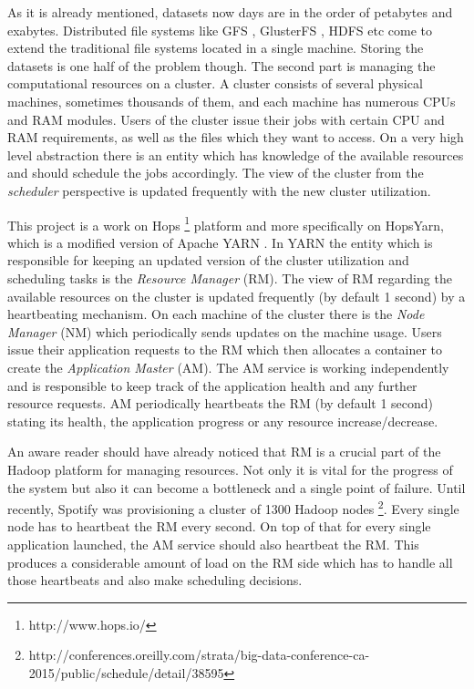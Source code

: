 As it is already mentioned, datasets now days are in the order of
petabytes and exabytes. Distributed file systems like GFS
\cite{Ghemawat:2003:GFS:1165389.945450}, 
GlusterFS \cite{glusterfs}, HDFS \cite{hdfs} etc come to extend
the traditional file systems located in a single machine. Storing the
datasets is one half of the problem though. The second part is
managing the computational resources on a cluster. A cluster consists
of several physical machines, sometimes thousands of them, and each
machine has numerous CPUs and RAM modules. Users of the cluster issue
their jobs with certain CPU and RAM requirements, as well as the files
which they want to access. On a very high level abstraction there is
an entity which has knowledge of the available resources and should
schedule the jobs accordingly. The view of the cluster from the
\emph{scheduler} perspective is updated frequently with the new
cluster utilization.

This project is a work on Hops \footnote{http://www.hops.io/} platform
and more specifically on HopsYarn, which is a modified version of
Apache YARN \cite{Vavilapalli:2013:AHY:2523616.2523633}. In YARN the
entity which is responsible for keeping an updated version of the
cluster utilization and scheduling tasks is the \emph{Resource
Manager} (RM). The view of RM regarding the available resources on the
cluster is updated frequently (by default 1 second) by a heartbeating
mechanism. On each machine of the cluster there is the \emph{Node
Manager} (NM) which periodically sends updates on the machine
usage. Users issue their application requests to the RM which then
allocates a container to create the \emph{Application Master}
(AM). The AM service is working independently and is responsible to
keep track of the application health and any further resource
requests. AM periodically heartbeats the RM (by default 1 second)
stating its health, the application progress or any resource
increase/decrease.

An aware reader should have already noticed that RM is a crucial part
of the Hadoop platform for managing resources. Not only it is vital
for the progress of the system but also it can become a
bottleneck and a single point of failure. Until recently, Spotify was
provisioning a cluster of 1300
Hadoop nodes \footnote{http://conferences.oreilly.com/strata/big-data-conference-ca-2015/public/schedule/detail/38595}. Every single node has to heartbeat the RM every
second. On top of that for every single application launched, the AM
service should also heartbeat the RM. This produces a considerable
amount of load on the RM side which has to handle all those heartbeats
and also make scheduling decisions.
